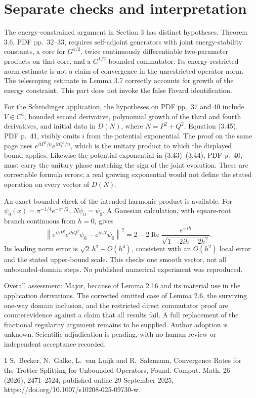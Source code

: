 \documentclass[10pt]{article}
\begin{document}
\section*{Separate checks and interpretation}
The energy-constrained argument in Section 3 has distinct hypotheses. Theorem 3.6, PDF pp. 32–33, requires self-adjoint generators with joint energy-stability constants, a core for \(G^{1/2}\), twice continuously differentiable two-parameter products on that core, and a \(G^{1/2}\)-bounded commutator. Its energy-restricted norm estimate is not a claim of convergence in the unrestricted operator norm. The telescoping estimate in Lemma 3.7 correctly accounts for growth of the energy constraint. This part does not invoke the false Favard identification.\par
For the Schrödinger application, the hypotheses on PDF pp. 37 and 40 include \(V\in C^4\), bounded second derivative, polynomial growth of the third and fourth derivatives, and initial data in \(D(N)\), where \(N=P^2+Q^2\). Equation (3.45), PDF p. 41, visibly omits \(i\) from the potential exponential. The proof on the same page uses \(e^{itP^2/n}e^{itQ^2/n}\), which is the unitary product to which the displayed bound applies. Likewise the potential exponential in (3.43)–(3.44), PDF p. 40, must carry the unitary phase matching the sign of the joint evolution. These are correctable formula errors; a real growing exponential would not define the stated operation on every vector of \(D(N)\).\par
An exact bounded check of the intended harmonic product is available. For \(\psi_0(x)=\pi^{-1/4}e^{-x^2/2}\), \(N\psi_0=\psi_0\). A Gaussian calculation, with square-root branch continuous from \(h=0\), gives \[\left\lVert e^{ihP^2}e^{ihQ^2}\psi_0-e^{ihN}\psi_0\right\rVert^2
 =2-2\operatorname{Re}
       \frac{e^{-ih}}{\sqrt{1-2ih-2h^2}} .\] Its leading norm error is \(\sqrt2\,h^2+O(h^4)\), consistent with an \(O(h^2)\) local error and the stated upper-bound scale. This checks one smooth vector, not all unbounded-domain steps. No published numerical experiment was reproduced.\par
Overall assessment: Major, because of Lemma 2.16 and its material use in the application derivations. The corrected omitted case of Lemma 2.6, the surviving one-way domain inclusion, and the restricted direct commutator proof are counterevidence against a claim that all results fail. A full replacement of the fractional regularity argument remains to be supplied. Author adoption is unknown. Scientific adjudication is pending, with no human review or independent acceptance recorded.\par
1 S. Becker, N. Galke, L. van Luijk and R. Salzmann, Convergence Rates for the Trotter Splitting for Unbounded Operators, Found. Comput. Math. 26 (2026), 2471–2524, published online 29 September 2025, https://doi.org/10.1007/s10208-025-09730-w.\par
\end{document}

